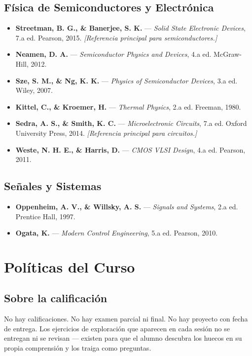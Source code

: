 \documentclass[11pt, letterpaper]{article}
\begin{document}
\subsection*{F\'isica de Semiconductores y Electr\'onica}
\begin{itemize}
  \item \textbf{Streetman, B. G., \& Banerjee, S. K.} --- \emph{Solid State Electronic Devices}, 7.a ed. Pearson, 2015. \textit{[Referencia principal para semiconductores.]}
  \item \textbf{Neamen, D. A.} --- \emph{Semiconductor Physics and Devices}, 4.a ed. McGraw-Hill, 2012.
  \item \textbf{Sze, S. M., \& Ng, K. K.} --- \emph{Physics of Semiconductor Devices}, 3.a ed. Wiley, 2007.
  \item \textbf{Kittel, C., \& Kroemer, H.} --- \emph{Thermal Physics}, 2.a ed. Freeman, 1980.
  \item \textbf{Sedra, A. S., \& Smith, K. C.} --- \emph{Microelectronic Circuits}, 7.a ed. Oxford University Press, 2014. \textit{[Referencia principal para circuitos.]}
  \item \textbf{Weste, N. H. E., \& Harris, D.} --- \emph{CMOS VLSI Design}, 4.a ed. Pearson, 2011.
\end{itemize}

\subsection*{Se\~nales y Sistemas}
\begin{itemize}
  \item \textbf{Oppenheim, A. V., \& Willsky, A. S.} --- \emph{Signals and Systems}, 2.a ed. Prentice Hall, 1997.
  \item \textbf{Ogata, K.} --- \emph{Modern Control Engineering}, 5.a ed. Pearson, 2010.
\end{itemize}

\newpage

\section{Pol\'iticas del Curso}

\subsection*{Sobre la calificaci\'on}
No hay calificaciones. No hay examen parcial ni final. No hay proyecto con fecha de entrega. Los ejercicios de exploraci\'on que aparecen en cada sesi\'on no se entregan ni se revisan --- existen para que el alumno descubra los huecos en su propia comprensi\'on y los traiga como preguntas.
\end{document}
